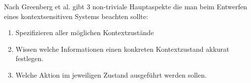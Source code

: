  Nach Greenberg et al. \cite{greenberg2001context} gibt 3 non-triviale Hauptaspekte die man beim Entwerfen eines kontextsensitiven Systems beachten sollte: 
\begin{enumerate}
\item{Spezifizieren aller möglichen Kontextzustände}
\item{Wissen welche Informationen einen konkreten Kontextzustand akkurat festlegen.}
\item{Welche Aktion im jeweiligen Zustand ausgeführt werden sollen.}
\end{enumerate}

